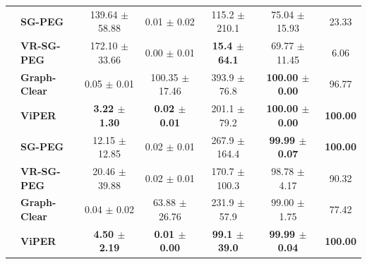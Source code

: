 \documentclass[conference]{IEEEtran}
\begin{document}
\begin{table}[t]
\begin{tabular}{l l cc c c c}
		\midrule
		
		& \textbf{SG-PEG}       & 139.64 $\pm$ 58.88 & 0.01 $\pm$ 0.02 & 115.2 $\pm$ 210.1 & 75.04 $\pm$ 15.93 & 23.33 \\
		& \textbf{VR-SG-PEG}    & 172.10 $\pm$ 33.66 & 0.00 $\pm$ 0.01 & \textbf{15.4 $\pm$ 64.1} & 69.77 $\pm$ 11.45 & 6.06 \\
		& \textbf{Graph-Clear}  & 0.05 $\pm$ 0.01 & 100.35 $\pm$ 17.46 & 393.9 $\pm$ 76.8 & \textbf{100.00 $\pm$ 0.00} & 96.77 \\
		& \textbf{ViPER}         & \textbf{3.22 $\pm$ 1.30} & \textbf{0.02 $\pm$ 0.01} & 201.1 $\pm$ 79.2 & \textbf{100.00 $\pm$ 0.00} & \textbf{100.00} \\

		\midrule

		
		
		& \textbf{SG-PEG}        & 12.15 $\pm$ 12.85 & 0.02 $\pm$ 0.01 & 267.9 $\pm$ 164.4 & \textbf{99.99 $\pm$ 0.07} & \textbf{100.00} \\
		& \textbf{VR-SG-PEG}     & 20.46 $\pm$ 39.88 & 0.02 $\pm$ 0.01 & 170.7 $\pm$ 100.3 & 98.78 $\pm$ 4.17 & 90.32 \\
		& \textbf{Graph-Clear}   & 0.04 $\pm$ 0.02 & 63.88 $\pm$ 26.76 & 231.9 $\pm$ 57.9 & 99.00 $\pm$ 1.75 & 77.42 \\
		& \textbf{ViPER}         & \textbf{4.50 $\pm$ 2.19} & \textbf{0.01 $\pm$ 0.00} & \textbf{99.1 $\pm$ 39.0} & \textbf{99.99 $\pm$ 0.04} & \textbf{100.00} \\

		\bottomrule
	\end{tabular}
\end{table}
\end{document}

